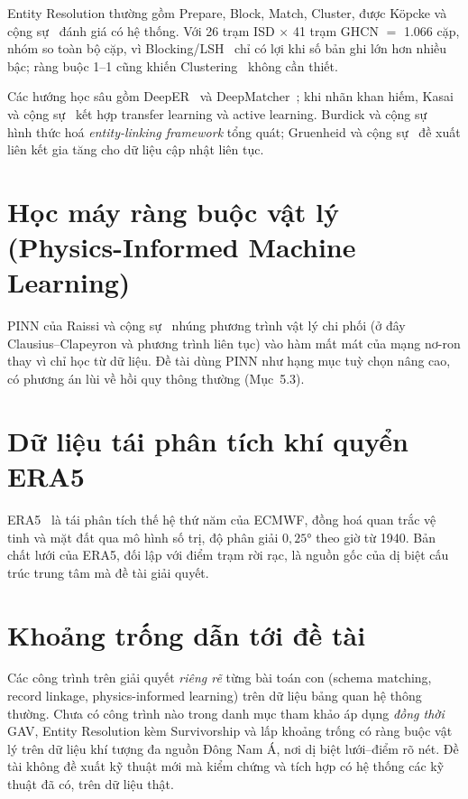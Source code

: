 \documentclass[12pt,a4paper]{report}
\begin{document}
Entity Resolution thường gồm Prepare, Block, Match, Cluster, được Köpcke và cộng
sự~\cite{kopcke2010evaluation} đánh giá có hệ thống. Với 26 trạm ISD $\times$ 41 trạm GHCN $=$ 1.066 cặp,
nhóm so toàn bộ cặp, vì Blocking/LSH~\cite{gionis1999similarity} chỉ có lợi khi số bản ghi lớn hơn nhiều bậc;
ràng buộc 1--1 cũng khiến Clustering~\cite{bansal2004correlation,hassanzadeh2009framework} không cần thiết.

Các hướng học sâu gồm DeepER~\cite{ebraheem2018deeper} và DeepMatcher~\cite{mudgal2018deep}; khi nhãn khan
hiếm, Kasai và cộng sự~\cite{kasai2019lowresource} kết hợp transfer learning và active learning. Burdick và
cộng sự~\cite{burdick2017expressive} hình thức hoá \emph{entity-linking framework} tổng quát; Gruenheid và
cộng sự~\cite{gruenheid2014incremental} đề xuất liên kết gia tăng cho dữ liệu cập nhật liên tục.

\section{Học máy ràng buộc vật lý (Physics-Informed Machine Learning)}

PINN của Raissi và cộng sự~\cite{raissi2019physics} nhúng phương trình vật lý chi phối (ở đây
Clausius--Clapeyron và phương trình liên tục) vào hàm mất mát của mạng nơ-ron thay vì chỉ học từ dữ liệu.
Đề tài dùng PINN như hạng mục tuỳ chọn nâng cao, có phương án lùi về hồi quy thông thường (Mục~5.3).

\section{Dữ liệu tái phân tích khí quyển ERA5}

ERA5~\cite{hersbach2020era5} là tái phân tích thế hệ thứ năm của ECMWF, đồng hoá quan trắc vệ tinh và
mặt đất qua mô hình số trị, độ phân giải $0{,}25°$ theo giờ từ 1940. Bản chất lưới của ERA5, đối lập với
điểm trạm rời rạc, là nguồn gốc của dị biệt cấu trúc trung tâm mà đề tài giải quyết.

\section{Khoảng trống dẫn tới đề tài}

Các công trình trên giải quyết \emph{riêng rẽ} từng bài toán con (schema matching, record linkage,
physics-informed learning) trên dữ liệu bảng quan hệ thông thường. Chưa có công trình nào trong danh mục
tham khảo áp dụng \emph{đồng thời} GAV, Entity Resolution kèm Survivorship và lấp khoảng trống có ràng
buộc vật lý trên dữ liệu khí tượng đa nguồn Đông Nam Á, nơi dị biệt lưới--điểm rõ nét. Đề tài không đề
xuất kỹ thuật mới mà kiểm chứng và tích hợp có hệ thống các kỹ thuật đã có, trên dữ liệu thật.
\end{document}
